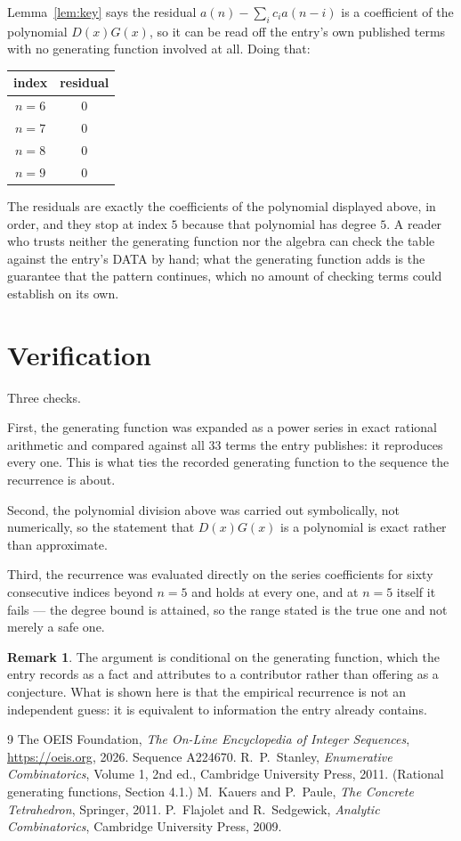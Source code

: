 \documentclass[11pt,a4paper]{article}
\theoremstyle{plain}
\theoremstyle{definition}
\newtheorem{remark}[theorem]{Remark}
\begin{document}
Lemma~\ref{lem:key} says the residual $a(n)-\sum_ic_ia(n-i)$ is a coefficient of the
polynomial $D(x)G(x)$, so it can be read off the entry's own published terms with no
generating function involved at all. Doing that:
\begin{center}
\begin{tabular}{cc}
index & residual \\ \hline
$n=6$ & $0$ \\
$n=7$ & $0$ \\
$n=8$ & $0$ \\
$n=9$ & $0$
\end{tabular}
\end{center}
The residuals are exactly the coefficients of the polynomial displayed above, in order, and
they stop at index $5$ because that polynomial has degree $5$. A reader who trusts
neither the generating function nor the algebra can check the table against the entry's DATA
by hand; what the generating function adds is the guarantee that the pattern continues, which
no amount of checking terms could establish on its own.

\section{Verification}

Three checks.

First, the generating function was expanded as a power series in exact rational arithmetic and
compared against all $33$ terms the entry publishes: it reproduces every one. This is
what ties the recorded generating function to the sequence the recurrence is about.

Second, the polynomial division above was carried out symbolically, not numerically, so the
statement that $D(x)G(x)$ is a polynomial is exact rather than approximate.

Third, the recurrence was evaluated directly on the series coefficients for sixty consecutive
indices beyond $n=5$ and holds at every one, and at $n=5$ itself it fails --- the
degree bound is attained, so the range stated is the true one and not merely a safe one.

\begin{remark}
The argument is conditional on the generating function, which the entry records as a fact and
attributes to a contributor rather than offering as a conjecture. What is shown here is that
the empirical recurrence is not an independent guess: it is equivalent to information the
entry already contains.
\end{remark}

\begin{thebibliography}{9}
 The OEIS Foundation, \emph{The On-Line Encyclopedia of Integer
Sequences}, \url{https://oeis.org}, 2026. Sequence A224670.
 R.~P.~Stanley, \emph{Enumerative Combinatorics}, Volume 1, 2nd ed.,
Cambridge University Press, 2011. (Rational generating functions, Section 4.1.)
 M.~Kauers and P.~Paule, \emph{The Concrete Tetrahedron}, Springer, 2011.
 P.~Flajolet and R.~Sedgewick, \emph{Analytic Combinatorics}, Cambridge
University Press, 2009.
\end{thebibliography}
\end{document}
